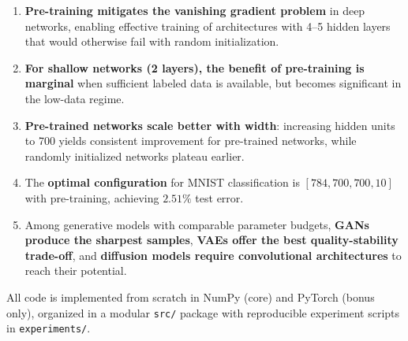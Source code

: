 \documentclass[11pt,a4paper]{article}
\begin{document}
\begin{enumerate}
    \item \textbf{Pre-training mitigates the vanishing gradient problem} in deep networks, enabling effective training of architectures with 4--5 hidden layers that would otherwise fail with random initialization.
    \item \textbf{For shallow networks (2 layers), the benefit of pre-training is marginal} when sufficient labeled data is available, but becomes significant in the low-data regime.
    \item \textbf{Pre-trained networks scale better with width}: increasing hidden units to 700 yields consistent improvement for pre-trained networks, while randomly initialized networks plateau earlier.
    \item The \textbf{optimal configuration} for MNIST classification is $[784, 700, 700, 10]$ with pre-training, achieving $2.51\%$ test error.
    \item Among generative models with comparable parameter budgets, \textbf{GANs produce the sharpest samples}, \textbf{VAEs offer the best quality-stability trade-off}, and \textbf{diffusion models require convolutional architectures} to reach their potential.
\end{enumerate}

All code is implemented from scratch in NumPy (core) and PyTorch (bonus only), organized in a modular \texttt{src/} package with reproducible experiment scripts in \texttt{experiments/}.
\end{document}
